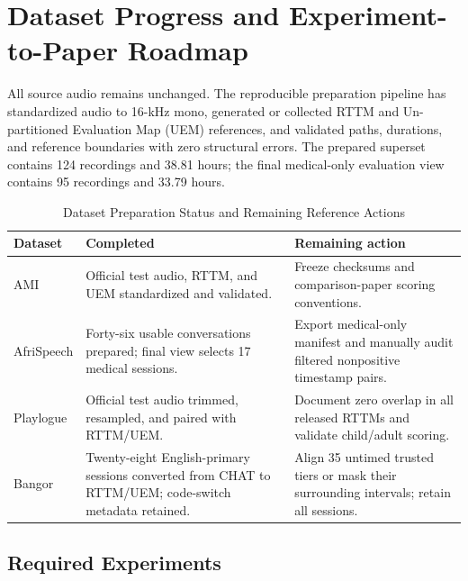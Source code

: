\documentclass[conference,onecolumn]{IEEEtran}
\begin{document}
\newpage

\section{Dataset Progress and Experiment-to-Paper Roadmap}

All source audio remains unchanged. The reproducible preparation pipeline has
standardized audio to 16-kHz mono, generated or collected RTTM and
Un-partitioned Evaluation Map (UEM) references, and validated paths, durations,
and reference boundaries with zero structural errors. The prepared superset
contains 124 recordings and 38.81 hours; the final medical-only evaluation view
contains 95 recordings and 33.79 hours.

\begin{table}[t]
\caption{Dataset Preparation Status and Remaining Reference Actions}
\label{tab:progress}
\centering
\footnotesize
\setlength{\tabcolsep}{3pt}
\begin{tabularx}{\columnwidth}{@{}p{}p{}Y@{}}
\toprule
\textbf{Dataset} & \textbf{Completed} & \textbf{Remaining action} \\
\midrule
AMI & Official test audio, RTTM, and UEM standardized and validated. & Freeze
checksums and comparison-paper scoring conventions. \\
AfriSpeech & Forty-six usable conversations prepared; final view selects 17
medical sessions. & Export medical-only manifest and manually audit filtered
nonpositive timestamp pairs. \\
Playlogue & Official test audio trimmed, resampled, and paired with RTTM/UEM. &
Document zero overlap in all released RTTMs and validate child/adult scoring. \\
Bangor & Twenty-eight English-primary sessions converted from CHAT to RTTM/UEM;
code-switch metadata retained. & Align 35 untimed trusted tiers or mask their
surrounding intervals; retain all sessions. \\
\bottomrule
\end{tabularx}
\end{table}

\subsection{Required Experiments}
\end{document}

